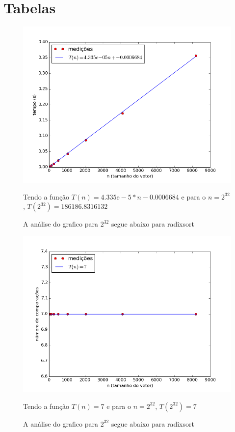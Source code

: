 \documentclass[12pt,a4paper,twoside]{report}
\begin{document}
\section{Tabelas}



\begin{figure}[ht]
\centering \includegraphics[scale=0.8]{../radixsort/imagens/radixsortAleatorio0.png}
\caption{A análise do grafico para $2^{32}$ segue abaixo para radixsort}

Tendo a função $T(n) = 4.335\mathrm{e}-5*n-0.0006684$ e para o $n =2^{32}$, $T(2^{32}) =186186.8316132
$ 
\label{fig:radixsortAleatorio0}
\end{figure}

\begin{figure}[ht]
\centering \includegraphics[scale=0.8]{../radixsort/imagens/radixsortAleatorio1.png}
\caption{A análise do grafico para $2^{32}$ segue abaixo para radixsort}

Tendo a função $T(n) = 7$ e para o $n =2^{32}$, $T(2^{32}) = 7$
\label{fig:radixsortAleatorio1}
\end{figure}
\end{document}
